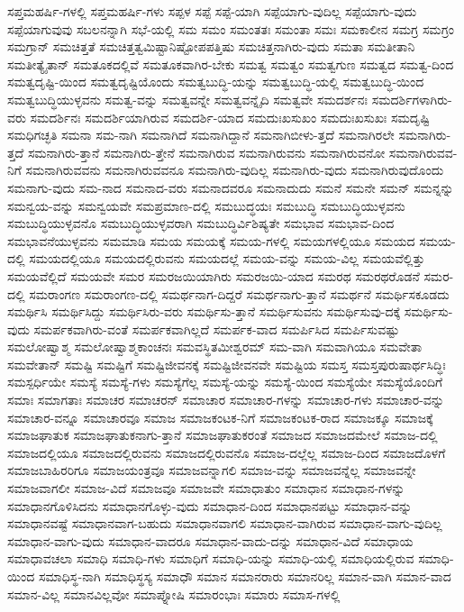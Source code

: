 {ಸಪ್ತಮಹರ್ಷಿ-ಗಳಲ್ಲಿ
ಸಪ್ತಮಹರ್ಷಿ-ಗಳು
ಸಪ್ಪಳ
ಸಪ್ಪೆ
ಸಪ್ಪೆ-ಯಾಗಿ
ಸಪ್ಪೆಯಾಗು-ವುದಿಲ್ಲ
ಸಪ್ಪೆಯಾಗು-ವುದು
ಸಪ್ಪೆಯಾಗುವುವು
ಸಬಲನನ್ನಾಗಿ
ಸಭೆ-ಯಲ್ಲಿ
ಸಮ
ಸಮಂ
ಸಮಂತತಃ
ಸಮಂತಾ
ಸಮಃ
ಸಮಕಾಲೀನ
ಸಮಗ್ರ
ಸಮಗ್ರಂ
ಸಮಗ್ರಾನ್
ಸಮಚಿತ್ತತೆ
ಸಮಚಿತ್ತತ್ವಮಿಷ್ಟಾನಿಷ್ಟೋಪಪತ್ತಿಷು
ಸಮಚಿತ್ತನಾಗಿರು-ವುದು
ಸಮತಾ
ಸಮತೀತಾನಿ
ಸಮತೀತ್ಯೈತಾನ್
ಸಮತೂಕದಲ್ಲಿವೆ
ಸಮತೂಕವಾಗಿರ-ಬೇಕು
ಸಮತ್ವ
ಸಮತ್ವಂ
ಸಮತ್ವಗುಣ
ಸಮತ್ವದ
ಸಮತ್ವ-ದಿಂದ
ಸಮತ್ವದೃಷ್ಟಿ-ಯಿಂದ
ಸಮತ್ವದೃಷ್ಟಿಯೊಂದು
ಸಮತ್ವಬುದ್ಧಿ-ಯನ್ನು
ಸಮತ್ವಬುದ್ಧಿ-ಯಲ್ಲಿ
ಸಮತ್ವಬುದ್ಧಿ-ಯಿಂದ
ಸಮತ್ವಬುದ್ಧಿಯುಳ್ಳವನು
ಸಮತ್ವ-ವನ್ನು
ಸಮತ್ವವನ್ನೇ
ಸಮತ್ವವನ್ನೈದಿ
ಸಮತ್ವವೇ
ಸಮದರ್ಶನಃ
ಸಮದರ್ಶಿಗಳಾಗಿರು-ವರು
ಸಮದರ್ಶಿನಃ
ಸಮದರ್ಶಿಯಾಗಿರುವ
ಸಮದರ್ಶಿ-ಯಾದ
ಸಮದುಃಖಸುಖಂ
ಸಮದುಃಖಸುಖಃ
ಸಮದೃಷ್ಟಿ
ಸಮಧಿಗಚ್ಛತಿ
ಸಮನಾ
ಸಮ-ನಾಗಿ
ಸಮನಾಗಿದೆ
ಸಮನಾಗಿದ್ದಾನೆ
ಸಮನಾಗಿಬೀಳು-ತ್ತದೆ
ಸಮನಾಗಿರಲೇ
ಸಮನಾಗಿರು-ತ್ತದೆ
ಸಮನಾಗಿರು-ತ್ತಾನೆ
ಸಮನಾಗಿರು-ತ್ತೇನೆ
ಸಮನಾಗಿರುವ
ಸಮನಾಗಿರುವನು
ಸಮನಾಗಿರುವನೋ
ಸಮನಾಗಿರುವವ-ನಿಗೆ
ಸಮನಾಗಿರುವವನು
ಸಮನಾಗಿರುವವನೂ
ಸಮನಾಗಿರು-ವುದಿಲ್ಲ
ಸಮನಾಗಿರು-ವುದು
ಸಮನಾಗಿರುವುದೊಂದು
ಸಮನಾಗು-ವುದು
ಸಮ-ನಾದ
ಸಮನಾದ-ವರು
ಸಮನಾದವರೂ
ಸಮನಾದುದು
ಸಮನೆ
ಸಮನೇ
ಸಮನ್
ಸಮನ್ನನ್ನು
ಸಮನ್ವಯ-ವನ್ನು
ಸಮನ್ವಯವೇ
ಸಮಪ್ರಮಾಣ-ದಲ್ಲಿ
ಸಮಬುದ್ಧಯಃ
ಸಮಬುದ್ಧಿ
ಸಮಬುದ್ಧಿಯುಳ್ಳವನು
ಸಮಬುದ್ಧಿಯುಳ್ಳವನೊ
ಸಮಬುದ್ಧಿಯುಳ್ಳವರಾಗಿ
ಸಮಬುದ್ಧಿರ್ವಿಶಿಷ್ಯತೇ
ಸಮಭಾವ
ಸಮಭಾವ-ದಿಂದ
ಸಮಭಾವನೆಯುಳ್ಳವನು
ಸಮಮಾಡಿ
ಸಮಯ
ಸಮಯಕ್ಕೆ
ಸಮಯ-ಗಳಲ್ಲಿ
ಸಮಯಗಳಲ್ಲಿಯೂ
ಸಮಯದ
ಸಮಯ-ದಲ್ಲಿ
ಸಮಯದಲ್ಲಿಯೂ
ಸಮಯದಲ್ಲಿರುವನು
ಸಮಯದಲ್ಲೆ
ಸಮಯ-ವನ್ನು
ಸಮಯ-ವಿಲ್ಲ
ಸಮಯವೆಲ್ಲಿತ್ತು
ಸಮಯವೆಲ್ಲಿದೆ
ಸಮಯವೇ
ಸಮರ
ಸಮರಜಯಿಯಾಗಿರು
ಸಮರಜಯಿ-ಯಾದ
ಸಮರಥ
ಸಮರಥರೊಡನೆ
ಸಮರ-ದಲ್ಲಿ
ಸಮರಾಂಗಣ
ಸಮರಾಂಗಣ-ದಲ್ಲಿ
ಸಮರ್ಥನಾಗ-ದಿದ್ದರೆ
ಸಮರ್ಥನಾಗು-ತ್ತಾನೆ
ಸಮರ್ಥನೆ
ಸಮರ್ಥಿಸಕೂಡದು
ಸಮರ್ಥಿಸಿ
ಸಮರ್ಥಿಸಿದ್ದು
ಸಮರ್ಥಿಸಿರು-ವರು
ಸಮರ್ಥಿಸು-ತ್ತಾನೆ
ಸಮರ್ಥಿಸುವನು
ಸಮರ್ಥಿಸುವು-ದಕ್ಕೆ
ಸಮರ್ಥಿಸು-ವುದು
ಸಮರ್ಪಕವಾಗಿರು-ವಂತೆ
ಸಮರ್ಪಕವಾಗಿಲ್ಲದೆ
ಸಮರ್ಪಕ-ವಾದ
ಸಮರ್ಪಿಸಿದ
ಸಮರ್ಪಿಸುವಷ್ಟು
ಸಮಲೋಷ್ವಾಶ್ಮ
ಸಮಲೋಷ್ವಾಶ್ಮಕಾಂಚನಃ
ಸಮವಸ್ಥಿತಮೀಶ್ವರಮ್
ಸಮ-ವಾಗಿ
ಸಮವಾಗಿಯೂ
ಸಮವೇತಾ
ಸಮವೇತಾನ್
ಸಮಷ್ಟಿ
ಸಮಷ್ಟಿಗೆ
ಸಮಷ್ಟಿಜೀವನಕ್ಕೆ
ಸಮಷ್ಟಿಜೀವನವೇ
ಸಮಷ್ಟಿಯ
ಸಮಸ್ತ
ಸಮಸ್ತಪುರುಷಾರ್ಥಸಿದ್ಧಿಃ
ಸಮಸ್ಪರ್ಧಿಯೇ
ಸಮಸ್ಯೆ
ಸಮಸ್ಯೆ-ಗಳು
ಸಮಸ್ಯೆಗೆಲ್ಲ
ಸಮಸ್ಯೆ-ಯನ್ನು
ಸಮಸ್ಯೆ-ಯಿಂದ
ಸಮಸ್ಯೆಯೇ
ಸಮಸ್ಯೆಯೊಂದಿಗೆ
ಸಮಾಃ
ಸಮಾಗತಾಃ
ಸಮಾಚರ
ಸಮಾಚರನ್
ಸಮಾಚಾರ
ಸಮಾಚಾರ-ಗಳನ್ನು
ಸಮಾಚಾರ-ಗಳು
ಸಮಾಚಾರ-ವನ್ನು
ಸಮಾಚಾರ-ವನ್ನೂ
ಸಮಾಚಾರವೂ
ಸಮಾಜ
ಸಮಾಜಕಂಟಕ-ನಿಗೆ
ಸಮಾಜಕಂಟಕ-ರಾದ
ಸಮಾಜಕ್ಕೂ
ಸಮಾಜಕ್ಕೆ
ಸಮಾಜಘಾತುಕ
ಸಮಾಜಘಾತುಕನಾಗು-ತ್ತಾನೆ
ಸಮಾಜಘಾತುಕರಂತೆ
ಸಮಾಜದ
ಸಮಾಜದಮೇಲೆ
ಸಮಾಜ-ದಲ್ಲಿ
ಸಮಾಜದಲ್ಲಿಯೂ
ಸಮಾಜದಲ್ಲಿರುವನು
ಸಮಾಜದಲ್ಲಿರುವನೊ
ಸಮಾಜ-ದಲ್ಲೆಲ್ಲ
ಸಮಾಜ-ದಿಂದ
ಸಮಾಜದೊಳಗೆ
ಸಮಾಜಬಾಹಿರರಿಗೂ
ಸಮಾಜಯಂತ್ರವೂ
ಸಮಾಜವನ್ನಾಗಲಿ
ಸಮಾಜ-ವನ್ನು
ಸಮಾಜವನ್ನೆಲ್ಲ
ಸಮಾಜವನ್ನೇ
ಸಮಾಜವಾಗಲೀ
ಸಮಾಜ-ವಿದೆ
ಸಮಾಜವೂ
ಸಮಾಜವೇ
ಸಮಾಧಾತುಂ
ಸಮಾಧಾನ
ಸಮಾಧಾನ-ಗಳನ್ನು
ಸಮಾಧಾನಗೊಳಿಸಿದನು
ಸಮಾಧಾನಗೊಳ್ಳು-ವುದು
ಸಮಾಧಾನ-ದಿಂದ
ಸಮಾಧಾನಪಟ್ಟು
ಸಮಾಧಾನ-ವನ್ನು
ಸಮಾಧಾನವಷ್ಟೆ
ಸಮಾಧಾನವಾಗ-ಬಹುದು
ಸಮಾಧಾನವಾಗಲಿ
ಸಮಾಧಾನ-ವಾಗಿರುವ
ಸಮಾಧಾನ-ವಾಗು-ವುದಿಲ್ಲ
ಸಮಾಧಾನ-ವಾಗು-ವುದು
ಸಮಾಧಾನ-ವಾದರೂ
ಸಮಾಧಾನ-ವಾದು-ದನ್ನು
ಸಮಾಧಾನ-ವಿದೆ
ಸಮಾಧಾಯ
ಸಮಾಧಾವಚಲಾ
ಸಮಾಧಿ
ಸಮಾಧಿ-ಗಳು
ಸಮಾಧಿಗೆ
ಸಮಾಧಿ-ಯನ್ನು
ಸಮಾಧಿ-ಯಲ್ಲಿ
ಸಮಾಧಿಯಲ್ಲಿರುವ
ಸಮಾಧಿ-ಯಿಂದ
ಸಮಾಧಿಸ್ಥ-ನಾಗಿ
ಸಮಾಧಿಸ್ಥಸ್ಯ
ಸಮಾಧೌ
ಸಮಾನ
ಸಮಾನರಾರು
ಸಮಾನರಿಲ್ಲ
ಸಮಾನ-ವಾಗಿ
ಸಮಾನ-ವಾದ
ಸಮಾನ-ವಿಲ್ಲ
ಸಮಾನವಿಲ್ಲವೋ
ಸಮಾಪ್ನೋಷಿ
ಸಮಾರಂಭಾಃ
ಸಮಾರು
ಸಮಾಸ-ಗಳಲ್ಲಿ
}
